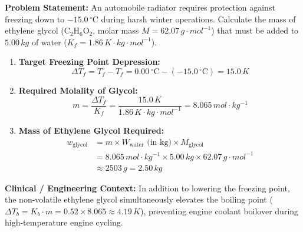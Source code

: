 \documentclass[10pt,twoside,openright]{book}
\begin{document}
\begin{usecasebox}
\textbf{Problem Statement:} An automobile radiator requires protection against freezing down to $-15.0\,^\circ\mathrm{C}$ during harsh winter operations. Calculate the mass of ethylene glycol ($\mathrm{C_2H_6O_2}$, molar mass $M = 62.07\,\si{g\cdot mol^{-1}}$) that must be added to $5.00\,\si{kg}$ of water ($K_f = 1.86\,\si{K\cdot kg\cdot mol^{-1}}$).
\begin{enumerate}
  \item \textbf{Target Freezing Point Depression:}
  \begin{equation*}
    \Delta T_f = T_f^\circ - T_f = 0.00\,^\circ\mathrm{C} - (-15.0\,^\circ\mathrm{C}) = 15.0\,\si{K}
  \end{equation*}
  \item \textbf{Required Molality of Glycol:}
  \begin{equation*}
    m = \frac{\Delta T_f}{K_f} = \frac{15.0\,\si{K}}{1.86\,\si{K\cdot kg\cdot mol^{-1}}} = 8.065\,\si{mol\cdot kg^{-1}}
  \end{equation*}
  \item \textbf{Mass of Ethylene Glycol Required:}
  \begin{align*}
    w_{\mathrm{glycol}} &= m \times W_{\mathrm{water}}\text{ (in kg)} \times M_{\mathrm{glycol}} \\
    &= 8.065\,\si{mol\cdot kg^{-1}} \times 5.00\,\si{kg} \times 62.07\,\si{g\cdot mol^{-1}} \\
    &\approx 2503\,\si{g} = 2.50\,\si{kg}
  \end{align*}
\end{enumerate}
\textbf{Clinical / Engineering Context:} In addition to lowering the freezing point, the non-volatile ethylene glycol simultaneously elevates the boiling point ($\Delta T_b = K_b \cdot m = 0.52 \times 8.065 \approx 4.19\,\si{K}$), preventing engine coolant boilover during high-temperature engine cycling.
\end{usecasebox}
\end{document}
